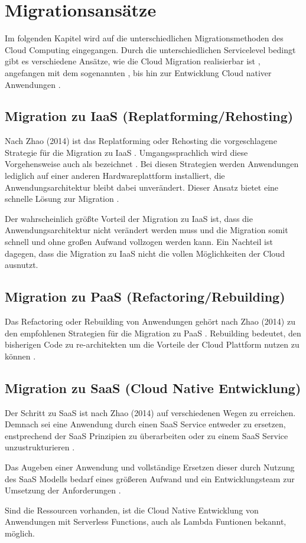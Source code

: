 \section{Migrationsansätze}

Im folgenden Kapitel wird auf die unterschiedlichen Migrationsmethoden des Cloud Computing eingegangen.
Durch die unterschiedlichen Servicelevel bedingt gibt es verschiedene Ansätze, wie die Cloud Migration realisierbar ist \cite[Vgl.][S. 226]{Surianarayanan2019},
angefangen mit dem sogenannten \grqq{}, bis hin zur Entwicklung Cloud nativer Anwendungen \cite[Vgl.][S. 144]{Zhao2014}.

\subsection{Migration zu IaaS (Replatforming/Rehosting)}
Nach Zhao (2014) ist das Replatforming oder Rehosting die vorgeschlagene Strategie für die Migration zu IaaS \cite[Vgl.][S. 144]{Zhao2014}.
Umgangssprachlich wird diese Vorgehensweise auch als \grqq{} bezeichnet \cite[Vgl.][]{NetApp}.
Bei diesen Strategien werden Anwendungen lediglich auf einer anderen Hardwareplattform installiert, die Anwendungsarchitektur bleibt dabei
unverändert. Dieser Ansatz bietet eine schnelle Lösung zur Migration \cite[Vgl.][]{CIO}.

Der wahrscheinlich größte Vorteil der Migration zu IaaS ist, dass die Anwendungsarchitektur nicht verändert werden muss und die Migration somit
schnell und ohne großen Aufwand vollzogen werden kann. Ein Nachteil ist dagegen, dass die Migration zu IaaS nicht die vollen Möglichkeiten der
Cloud ausnutzt.

\subsection{Migration zu PaaS (Refactoring/Rebuilding)}
Das Refactoring oder Rebuilding von Anwendungen gehört nach Zhao (2014) zu den empfohlenen Strategien für die Migration zu PaaS \cite[Vgl.][S. 144]{Zhao2014}.
Rebuilding bedeutet, den bisherigen Code zu re-architekten um die Vorteile der Cloud Plattform nutzen zu können \cite[Vgl.][]{CIO}.

\subsection{Migration zu SaaS (Cloud Native Entwicklung)}
Der Schritt zu SaaS ist nach Zhao (2014) auf verschiedenen Wegen zu erreichen. Demnach sei eine Anwendung durch einen SaaS Service entweder zu ersetzen,
enstprechend der SaaS Prinzipien zu überarbeiten oder zu einem SaaS Service unzustrukturieren \cite[Vgl.][S. 144]{Zhao2014}.

Das Augeben einer Anwendung und vollständige Ersetzen dieser durch Nutzung des SaaS Modells bedarf eines
größeren Aufwand und ein Entwicklungsteam zur Umsetzung der Anforderungen \cite[Vgl.][]{CIO}.

Sind die Ressourcen vorhanden, ist die Cloud Native Entwicklung von Anwendungen mit Serverless Functions, auch als
Lambda Funtionen bekannt, möglich.
